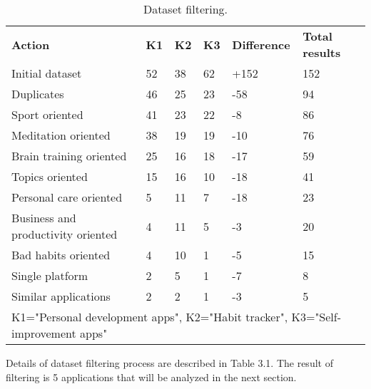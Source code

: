 \begin{table}[t!]
    \centering
    \begin{adjustbox}{width=\textwidth}
        \begin{ctucolortab}
            \begin{tabular}{llllll}
                \bfseries Action & \bfseries K1 & \bfseries K2 & \bfseries K3 & \bfseries Difference & \bfseries Total results \\\Midrule
                Initial dataset & 52 & 38 & 62 & +152 & 152\\
                Duplicates & 46 & 25 & 23 & -58 & 94\\
                Sport oriented & 41 & 23 & 22 & -8 & 86\\
                Meditation oriented & 38 & 19 & 19 & -10 & 76\\
                Brain training oriented & 25 & 16 & 18 & -17 & 59\\
                Topics oriented & 15 & 16 & 10 & -18 & 41\\
                Personal care oriented & 5 & 11 & 7 & -18 & 23\\
                Business and productivity oriented & 4 & 11 & 5 & -3 & 20\\
                Bad habits oriented & 4 & 10 & 1 & -5 & 15\\
                Single platform & 2 & 5 & 1 & -7 & 8\\
                Similar applications & 2 & 2 & 1 & -3 & 5\\
                \bottomrule
                \multicolumn{6}{1}{K1="Personal development apps", K2="Habit tracker", K3="Self-improvement apps"}
            \end{tabular}
        \end{ctucolortab}
    \end{adjustbox}
    \caption{Dataset filtering.}
    \label{tab:dataset-filtering}
\end{table}

Details of dataset filtering process are described in Table 3.1.
The result of filtering is 5 applications that will be analyzed in the next section.
